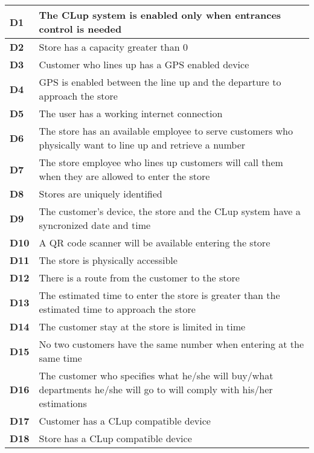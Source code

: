     \begin{center}
        {\renewcommand{\arraystretch}{2}%
        \begin{tabular}{L{2cm}L{12cm}}
            \hline
            \textbf{D1} & The CLup system is enabled only when entrances control is needed \\
            \hline
            \textbf{D2} & Store has a capacity greater than 0 \\
            \hline
            \textbf{D3} & Customer who lines up has a GPS enabled device \\
            \hline
            \textbf{D4} & GPS is enabled between the line up and the departure to approach the store \\
            \hline
            \textbf{D5} & The user has a working internet connection \\
            \hline
            \textbf{D6} & The store has an available employee to serve customers who physically want to line up and retrieve a number \\
            \hline
            \textbf{D7} & The store employee who lines up customers will call them when they are allowed to enter the store \\
            \hline
            \textbf{D8} & Stores are uniquely identified \\
            \hline
            \textbf{D9} & The customer's device, the store and the CLup system have a syncronized date and time \\
            \hline
            \textbf{D10} & A QR code scanner will be available entering the store \\
            \hline
            \textbf{D11} & The store is physically accessible \\
            \hline
            \textbf{D12} & There is a route from the customer to the store \\
            \hline
            \textbf{D13} & The estimated time to enter the store is greater than the estimated time to approach the store \\
            \hline
            \textbf{D14} & The customer stay at the store is limited in time \\
            \hline
            \textbf{D15} & No two customers have the same number when entering at the same time \\
            \hline
            \textbf{D16} & The customer who specifies what he/she will buy/what departments he/she will go to will comply with his/her estimations \\
            \hline
            \textbf{D17} & Customer has a CLup compatible device \\
            \hline
            \textbf{D18} & Store has a CLup compatible device \\
            \hline
        \end{tabular}}
    \end{center}